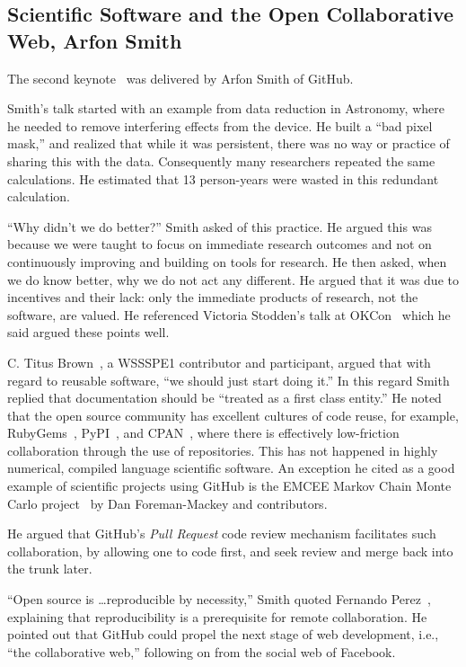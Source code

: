 \documentclass[11pt, oneside]{amsart}
\begin{document}
\subsection{Scientific Software and the Open Collaborative Web, Arfon Smith} \label{sec:keynote2}

The second keynote~\cite{WSSSPE1-keynote2} was delivered by Arfon
Smith of GitHub.

Smith's talk started with an example from data reduction in Astronomy,
where he needed to remove interfering effects from the device. He
built a ``bad pixel mask,'' and realized that while it was persistent,
there was no way or practice of sharing this with the
data. Consequently many researchers repeated the same calculations. He
estimated that 13 person-years were wasted in this redundant
calculation.

``Why didn't we do better?''  Smith asked of this practice. He argued
this was because we were taught to focus on immediate research
outcomes and not on continuously improving and building on tools for
research. He then asked, when we do know better, why we do not act any
different. He argued that it was due to incentives and their lack:
only the immediate products of research, not the software, are valued.
He referenced Victoria Stodden's talk at
OKCon~\cite{okcon-stodden-talk} which he said argued these points
well.

C. Titus Brown~\cite{ged-web}, a WSSSPE1 contributor and participant,
argued that with regard to reusable software, ``we should just start
doing it.'' In this regard Smith replied that documentation should be
``treated as a first class entity.''  He noted that the open source
community has excellent cultures of code reuse, for example,
RubyGems~\cite{rubygems-web}, PyPI~\cite{pypi-web}, and
CPAN~\cite{cpan-web}, where there is effectively low-friction
collaboration through the use of repositories. This has not happened
in highly numerical, compiled language scientific software.  An
exception he cited as a good example of scientific projects using
GitHub is the EMCEE Markov Chain Monte Carlo project~\cite{emcee-web}
by Dan Foreman-Mackey and contributors.

He argued that GitHub's \emph{Pull Request} code review mechanism
facilitates such collaboration, by allowing one to code first, and
seek review and merge back into the trunk later.

``Open source is \ldots reproducible by necessity,'' Smith quoted
Fernando Perez~\cite{perez-open-src-reproducible}, explaining that
reproducibility is a prerequisite for remote collaboration.  He
pointed out that GitHub could propel the next stage of web
development, i.e., ``the collaborative web,'' following on from the
social web of Facebook.
\end{document}
